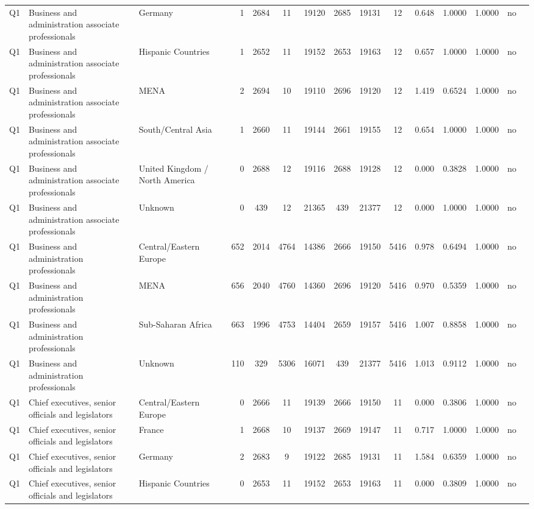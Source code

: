 \begin{longtable}{lllrcccccccccll}
Q1 & Business and administration associate professionals & Germany & 1 & 2684 & 11 & 19120 & 2685 & 19131 & 12 & 0.648 & 1.0000 & 1.0000 & no \\
Q1 & Business and administration associate professionals & Hispanic Countries & 1 & 2652 & 11 & 19152 & 2653 & 19163 & 12 & 0.657 & 1.0000 & 1.0000 & no \\
Q1 & Business and administration associate professionals & MENA & 2 & 2694 & 10 & 19110 & 2696 & 19120 & 12 & 1.419 & 0.6524 & 1.0000 & no \\
Q1 & Business and administration associate professionals & South/Central Asia & 1 & 2660 & 11 & 19144 & 2661 & 19155 & 12 & 0.654 & 1.0000 & 1.0000 & no \\
Q1 & Business and administration associate professionals & United Kingdom / North America & 0 & 2688 & 12 & 19116 & 2688 & 19128 & 12 & 0.000 & 0.3828 & 1.0000 & no \\
Q1 & Business and administration associate professionals & Unknown & 0 & 439 & 12 & 21365 & 439 & 21377 & 12 & 0.000 & 1.0000 & 1.0000 & no \\
Q1 & Business and administration professionals & Central/Eastern Europe & 652 & 2014 & 4764 & 14386 & 2666 & 19150 & 5416 & 0.978 & 0.6494 & 1.0000 & no \\
Q1 & Business and administration professionals & MENA & 656 & 2040 & 4760 & 14360 & 2696 & 19120 & 5416 & 0.970 & 0.5359 & 1.0000 & no \\
Q1 & Business and administration professionals & Sub-Saharan Africa & 663 & 1996 & 4753 & 14404 & 2659 & 19157 & 5416 & 1.007 & 0.8858 & 1.0000 & no \\
Q1 & Business and administration professionals & Unknown & 110 & 329 & 5306 & 16071 & 439 & 21377 & 5416 & 1.013 & 0.9112 & 1.0000 & no \\
Q1 & Chief executives, senior officials and legislators & Central/Eastern Europe & 0 & 2666 & 11 & 19139 & 2666 & 19150 & 11 & 0.000 & 0.3806 & 1.0000 & no \\
Q1 & Chief executives, senior officials and legislators & France & 1 & 2668 & 10 & 19137 & 2669 & 19147 & 11 & 0.717 & 1.0000 & 1.0000 & no \\
Q1 & Chief executives, senior officials and legislators & Germany & 2 & 2683 & 9 & 19122 & 2685 & 19131 & 11 & 1.584 & 0.6359 & 1.0000 & no \\
Q1 & Chief executives, senior officials and legislators & Hispanic Countries & 0 & 2653 & 11 & 19152 & 2653 & 19163 & 11 & 0.000 & 0.3809 & 1.0000 & no \\

\end{longtable}
